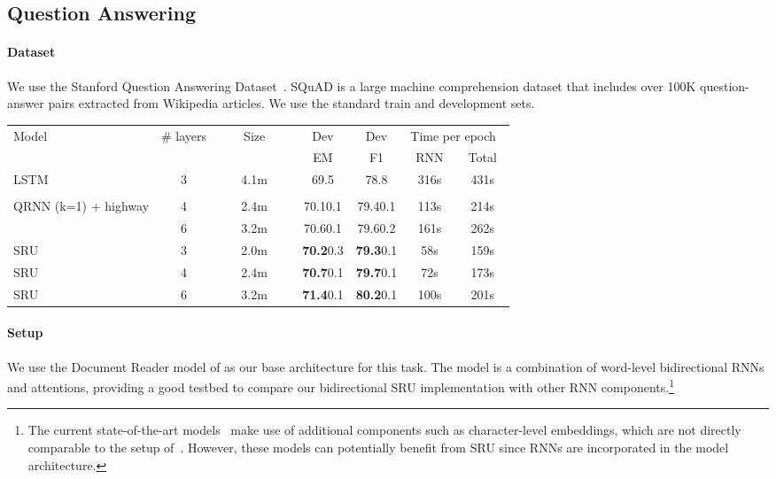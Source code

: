 \documentclass[11pt,a4paper]{article}
\begin{document}
\subsection{Question Answering}
\label{sec:exp:qa}

\paragraph{Dataset}
We use the Stanford Question Answering Dataset~\citep[SQuAD;][]{rajpurkar2016squad}. 
SQuAD is a large machine comprehension dataset that includes over 100K question-answer pairs extracted from Wikipedia articles.
We use the standard train and development sets.

\newcommand\Bstrut{\rule[-1.3ex]{0pt}{0pt}}   \begin{table*}[!ht!]
  \centering
  \begin{tabular}{@{~~}lccc@{~~~~~~}ccc@{~~}}
    \toprule
    \multirow{2}{*}{Model} & \multirow{2}{*}{\# layers} & \multirow{2}{*}{{~~~~}Size{~~~~}} & Dev & Dev & \multicolumn{2}{c}{Time per epoch{~}}\\
    & & & EM & F1 & {~}RNN{~} & {~}Total{~} \\
    \midrule
LSTM & \multirow{2}{*}{3} & \multirow{2}{*}{4.1m} & \multirow{2}{*}{69.5} & \multirow{2}{*}{78.8} & \multirow{2}{*}{316s} & \multirow{2}{*}{431s} \\
\citep{chen2017reading} & &  &  &  &  & \\
\midrule
\multirow{2}{*}{QRNN (k=1) + highway} & 4 & 2.4m & 70.10.1& 79.40.1& 113s & 214s \\
& 6 & 3.2m & 70.60.1 & 79.60.2 & 161s & 262s \\
\midrule
SRU & 3 & 2.0m & \textbf{70.2}0.3 & \textbf{79.3}0.1 & 58s & 159s\\
SRU & 4 & 2.4m & \textbf{70.7}0.1 & \textbf{79.7}0.1 & 72s & 173s\\
SRU & 6 & 3.2m & \textbf{71.4}0.1 & \textbf{80.2}0.1 & 100s & 201s\\
    \bottomrule
   \end{tabular}
\caption{\label{table:squad}Exact match (EM) and F1 scores of various models on SQuAD (Section~\ref{sec:exp:qa}). 
   We also report the total processing time per epoch and the time spent in RNN computations.
   SRU outperforms other models, and is more than five times faster than cuDNN LSTM. }
\end{table*}

\paragraph{Setup}
We use the Document Reader model of \citet{chen2017reading} as our base architecture for this task.
The model is a combination of word-level bidirectional RNNs and attentions, providing a good testbed to compare our bidirectional SRU implementation with other RNN components.\footnote{The current state-of-the-art models~\citep{seo2016bidirectional,wang2017gated} make use of additional components such as character-level embeddings, which are not directly comparable to the setup of~\citet{chen2017reading}.
However, these models can potentially benefit from SRU since RNNs are incorporated in the model architecture.}
\end{document}

